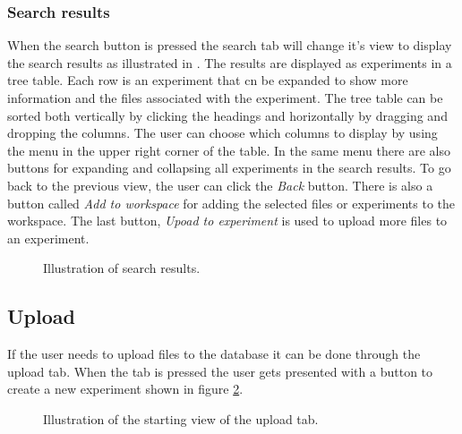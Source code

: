 \subsubsection{Search results}
When the search button is pressed the search tab will change it's view to display the search results as illustrated in . The results are displayed as experiments in a tree table. Each row is an experiment that cn be expanded to show more information and the files associated with the experiment. The tree table can be sorted both vertically by clicking the headings and horizontally by dragging and dropping the columns. The user can choose which columns to display by using the menu in the upper right corner of the table. In the same menu there are also buttons for expanding and collapsing all experiments in the search results. To go back to the previous view, the user can click the \emph{Back} button. There is also a button called \emph{Add to workspace} for adding the selected files or experiments to the workspace. The last button, \emph{Upoad to experiment} is used to upload more files to an experiment.

\begin{figure}[htb]
	\caption{Illustration of search results.}
	\label{fig:des_search-results}
\end{figure}
\FloatBarrier

\subsection{Upload}
If the user needs to upload files to the database it can be done through the upload tab. When the tab is pressed the user gets presented with a button to create a new experiment shown in figure \ref{fig:des_upload-tab}.
\newpage
\begin{figure}[h!]
	\caption{Illustration of the starting view of the upload tab.}
	\label{fig:des_upload-tab}
\end{figure}
